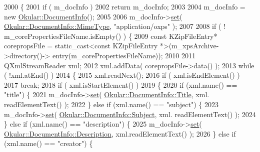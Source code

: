\begin{DoxyCode}
2000 \{
2001     \textcolor{keywordflow}{if} ( m\_docInfo )
2002         \textcolor{keywordflow}{return} m\_docInfo;
2003 
2004     m\_docInfo = \textcolor{keyword}{new} \hyperlink{classOkular_1_1DocumentInfo}{Okular::DocumentInfo}();
2005 
2006     m\_docInfo->\hyperlink{classOkular_1_1DocumentInfo_a8bd5403394ab192f1103cbf2a8e48d9b}{set}( \hyperlink{classOkular_1_1DocumentInfo_a3a6e5f7fb246e29bcb2e830b6f770791a786464e8e8c3e6ba1cd74e408487785b}{Okular::DocumentInfo::MimeType}, \textcolor{stringliteral}{"application/oxps"} );
2007 
2008     \textcolor{keywordflow}{if} ( ! m\_corePropertiesFileName.isEmpty() ) \{
2009         \textcolor{keyword}{const} KZipFileEntry* corepropsFile = \textcolor{keyword}{static\_cast<}\textcolor{keyword}{const }KZipFileEntry *\textcolor{keyword}{>}(m\_xpsArchive->directory()->
      entry(m\_corePropertiesFileName));
2010 
2011         QXmlStreamReader xml;
2012         xml.addData( corepropsFile->data() );
2013         \textcolor{keywordflow}{while} ( !xml.atEnd() )
2014         \{
2015             xml.readNext();
2016             \textcolor{keywordflow}{if} ( xml.isEndElement() )
2017                 \textcolor{keywordflow}{break};
2018             \textcolor{keywordflow}{if} ( xml.isStartElement() )
2019             \{
2020                 \textcolor{keywordflow}{if} (xml.name() == \textcolor{stringliteral}{"title"}) \{
2021                     m\_docInfo->\hyperlink{classOkular_1_1DocumentInfo_a8bd5403394ab192f1103cbf2a8e48d9b}{set}( \hyperlink{classOkular_1_1DocumentInfo_a3a6e5f7fb246e29bcb2e830b6f770791ae400626d63f14b61c55bd22aca9481e0}{Okular::DocumentInfo::Title}, xml.
      readElementText() );
2022                 \} \textcolor{keywordflow}{else} \textcolor{keywordflow}{if} (xml.name() == \textcolor{stringliteral}{"subject"}) \{
2023                     m\_docInfo->\hyperlink{classOkular_1_1DocumentInfo_a8bd5403394ab192f1103cbf2a8e48d9b}{set}( \hyperlink{classOkular_1_1DocumentInfo_a3a6e5f7fb246e29bcb2e830b6f770791a19478a99f97624500aa2d050fe7e1ad8}{Okular::DocumentInfo::Subject}, xml.
      readElementText() );
2024                 \} \textcolor{keywordflow}{else} \textcolor{keywordflow}{if} (xml.name() == \textcolor{stringliteral}{"description"}) \{
2025                     m\_docInfo->\hyperlink{classOkular_1_1DocumentInfo_a8bd5403394ab192f1103cbf2a8e48d9b}{set}( \hyperlink{classOkular_1_1DocumentInfo_a3a6e5f7fb246e29bcb2e830b6f770791acc3edf1d2abe6eecb0882f4389475591}{Okular::DocumentInfo::Description}, 
      xml.readElementText() );
2026                 \} \textcolor{keywordflow}{else} \textcolor{keywordflow}{if} (xml.name() == \textcolor{stringliteral}{"creator"}) \{

\end{DoxyCode}
